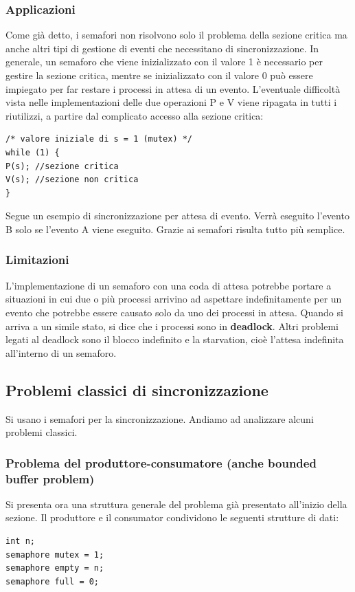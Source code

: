 \documentclass[a4paper]{article}
\begin{document}
\subsubsection{Applicazioni}
Come già detto, i semafori non risolvono solo il problema della sezione critica ma anche altri tipi di gestione di eventi che necessitano di sincronizzazione. In generale, un semaforo che viene inizializzato con il valore 1 è necessario per gestire la sezione critica, mentre se inizializzato con il valore 0 può essere impiegato per far restare i processi in attesa di un evento. L'eventuale difficoltà vista nelle implementazioni delle due operazioni P e V viene ripagata in tutti i riutilizzi, a partire dal complicato accesso alla sezione critica:
\begin{verbatim}
/* valore iniziale di s = 1 (mutex) */
while (1) {
P(s); //sezione critica
V(s); //sezione non critica
}
\end{verbatim}
Segue un esempio di sincronizzazione per attesa di evento. Verrà eseguito l’evento B solo se l’evento A viene eseguito. Grazie ai semafori risulta tutto più semplice.

\subsubsection{Limitazioni}
L'implementazione di un semaforo con una coda di attesa potrebbe portare a situazioni in cui due o più processi arrivino ad aspettare indefinitamente per un evento che potrebbe essere causato solo da uno dei processi in attesa. Quando si arriva a un simile stato, si dice che i processi sono in \textbf{deadlock}. Altri problemi legati al deadlock sono il blocco indefinito e la starvation, cioè l'attesa indefinita all'interno di un semaforo.

\subsection{Problemi classici di sincronizzazione}
Si usano i semafori per la sincronizzazione. Andiamo ad analizzare alcuni problemi classici.
\subsubsection{Problema del produttore-consumatore (anche bounded buffer problem)}
Si presenta ora una struttura generale del problema già presentato all'inizio della sezione. Il produttore e il consumator condividono le seguenti strutture di dati:
\begin{verbatim}
int n;
semaphore mutex = 1;
semaphore empty = n;
semaphore full = 0;
\end{verbatim}
\end{document}
